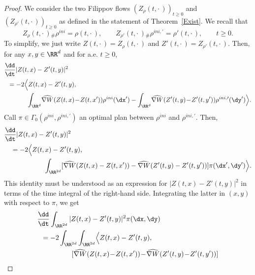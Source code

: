 \begin{proof}
We consider the two Filippov flows $(Z_{\rho}(t,{\cdot\,}))_{t \geq 0}$ and $(Z_{\rho'}(t,{\cdot\,}))_{t \geq 0}$ as defined in the statement of Theorem~\ref{Exist}. We recall that
\begin{equation}\label{eq:aux:proof}
Z_{\rho}(t,{\cdot\,}){}_{\#} \rho^{ini}=
\rho(t,{\cdot\,}), \qquad Z_{\rho'}(t,{\cdot\,}){}_{\#} \rho^{ini,\prime}=
\rho'(t,{\cdot\,}), \qquad t \geq 0.
\end{equation}
To simplify, we just write $Z(t,{\cdot\,}) = Z_{\rho}(t,{\cdot\,})$ and $Z'(t,{\cdot\,}) = Z_{\rho'}(t,{\cdot\,})$. Then, for any $x,y \in \RR^d$ and for a.e. $t \geq 0$,
\begin{equation*}
\begin{split}
&\frac{\dd}{\dt} \vert Z(t,x) - Z'(t,y) \vert^2
\\
&\;\;= - 2 \Bigl\langle Z(t,x) - Z'(t,y),
\\
&\qquad\quad\;\; \int_{\RR^d}\!
\widehat{\nabla W}(Z(t,x) \!-\! Z(t,x') ) \rho^{ini}(\dx') -
\int_{\RR^d}\!
\widehat{\nabla W}(Z'(t,y) \!-\! Z'(t,y') ) \rho^{ini,\prime}(\dy')
\Bigr\rangle.
\end{split}
\end{equation*}
Call $\pi \in \Gamma_{0}(\rho^{ini},\rho^{ini,\prime})$ an optimal plan between $\rho^{ini}$ and $\rho^{ini,\prime}$. Then,
\begin{equation*}
\begin{split}
&\frac{\dd}{\dt} \vert Z(t,x) - Z'(t,y) \vert^2\\
&\quad = - 2 \Bigl\langle Z(t,x) - Z'(t,y),\\
&\qquad\qquad\qquad
\int_{\RR^{2d}}
[\widehat{\nabla W}(Z(t,x) - Z(t,x') ) -
\widehat{\nabla W}(Z'(t,y) - Z'(t,y') ) ]
\pi(\dx',\dy')
\Bigr\rangle.
\end{split}
\end{equation*}
This identity must be understood as an expression for $|Z(t,x) - Z'(t,y)|^2$ in terms of the time integral of the right-hand side. Integrating the latter in $(x,y)$ with respect to $\pi$, we get
\begin{equation*}
\begin{split}
&\frac{\dd}{\dt} \int_{\RR^{2d}} \vert Z(t,x) - Z'(t,y) \vert^2
\pi(\dx,\dy)
\\
&\;\; =- 2
\int_{\RR^{2d}}
\int_{\RR^{2d}}
\Bigl\langle Z(t,x) - Z'(t,y),
\\
&\qquad\qquad\quad
[
\widehat{\nabla W}(Z(t,x) \!-\! Z(t,x') ) \!-\!
\widehat{\nabla W}(Z'(t,y) \!-\! Z'(t,y') ) ]

\end{split}
\end{equation*}
\end{proof}
